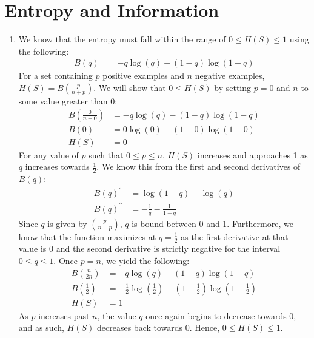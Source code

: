 \documentclass[11pt]{article}
\newcommand{\solution}[1]{{{\color{blue}{\bf Solution:} {#1}}}}
\begin{document}
\section{Entropy and Information}
\begin{enumerate}
\item
\solution{We know that the entropy must fall within the range of $0 \leq H(S) \leq 1$ using the following:
\begin{align}
B(q) &= -q\log(q) - (1-q)\log(1-q)
\end{align}
For a set containing $p$ positive examples and $n$ negative examples, $H(S) = B(\frac{p}{n+p})$. We will show that $0 \leq H(S)$ by setting $p=0$ and $n$ to some value greater than 0:
\begin{align}
B(\tfrac{0}{n+0}) &= -q\log(q) - (1-q)\log(1-q) \\
B(0) &= 0\log(0) - (1-0)\log(1-0) \\
H(S) &= 0
\end{align}
For any value of $p$ such that $0 \leq p \leq n$, $H(S)$ increases and approaches 1 as $q$ increases towards $\frac{1}{2}$. We know this from the first and second derivatives of $B(q)$:
\begin{align}
B(q)^{\prime} &= \log(1-q) - \log(q) \\
B(q)^{\prime\prime} &= -\frac{1}{q} - \frac{1}{1-q}
\end{align}
Since $q$ is given by $(\tfrac{p}{n+p})$, $q$ is bound between 0 and 1. Furthermore, we know that the function maximizes at $q = \frac{1}{2}$ as the first derivative at that value is 0 and the second derivative is strictly negative for the interval $ 0 \leq q \leq 1$. Once $p = n$, we yield the following: 
\begin{align}
B(\tfrac{n}{2n}) &= -q\log(q) - (1-q)\log(1-q) \\
B(\tfrac{1}{2}) &= -\tfrac{1}{2}\log(\tfrac{1}{2}) - (1-\tfrac{1}{2})\log(1-\tfrac{1}{2}) \\
H(S) &= 1
\end{align}
As $p$ increases past $n$, the value $q$ once again begins to decrease towards 0, and as such, $H(S)$ decreases back towards 0. Hence, $0 \leq H(S) \leq 1$.
}
\newpage


\end{enumerate}
\end{document}
